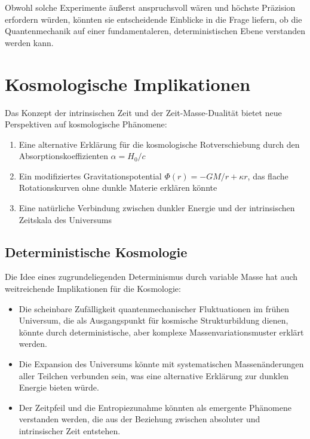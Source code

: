\documentclass[12pt,a4paper]{article}  %
\begin{document}
		Obwohl solche Experimente äußerst anspruchsvoll wären und höchste Präzision erfordern würden, könnten sie entscheidende Einblicke in die Frage liefern, ob die Quantenmechanik auf einer fundamentaleren, deterministischen Ebene verstanden werden kann.
		
		\section{Kosmologische Implikationen}
		
		Das Konzept der intrinsischen Zeit und der Zeit-Masse-Dualität bietet neue Perspektiven auf kosmologische Phänomene:
		
		\begin{enumerate}
		\item Eine alternative Erklärung für die kosmologische Rotverschiebung durch den Absorptionskoeffizienten $\alpha = H_0/c$
		\item Ein modifiziertes Gravitationspotential $\Phi(r) = -GM/r + \kappa r$, das flache Rotationskurven ohne dunkle Materie erklären könnte
		\item Eine natürliche Verbindung zwischen dunkler Energie und der intrinsischen Zeitskala des Universums
		\end{enumerate}
		
		\subsection{Deterministische Kosmologie}
		
		Die Idee eines zugrundeliegenden Determinismus durch variable Masse hat auch weitreichende Implikationen für die Kosmologie:
		
		\begin{itemize}
		\item Die scheinbare Zufälligkeit quantenmechanischer Fluktuationen im frühen Universum, die als Ausgangspunkt für kosmische Strukturbildung dienen, könnte durch deterministische, aber komplexe Massenvariationsmuster erklärt werden.
		
		\item Die Expansion des Universums könnte mit systematischen Massenänderungen aller Teilchen verbunden sein, was eine alternative Erklärung zur dunklen Energie bieten würde.
		
		\item Der Zeitpfeil und die Entropiezunahme könnten als emergente Phänomene verstanden werden, die aus der Beziehung zwischen absoluter und intrinsischer Zeit entstehen.
		\end{itemize}
		
\end{document}
